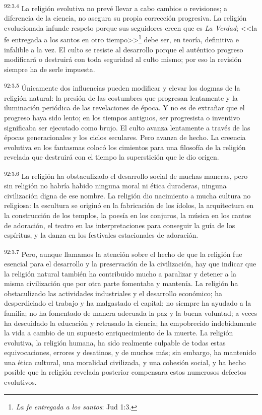 \documentclass[twoside, 11pt]{book}
\begin{document}
\par
\textsuperscript{92:3.4} La religión evolutiva no prevé llevar a cabo cambios o revisiones; a diferencia de la ciencia, no asegura su propia corrección progresiva. La religión evolucionada infunde respeto porque sus seguidores creen que es \textit{La Verdad}; <<la fe entregada a los santos en otro tiempo>>\footnote{\textit{La fe entregada a los santos}: Jud 1:3.} debe ser, en teoría, definitiva e infalible a la vez. El culto se resiste al desarrollo porque el auténtico progreso modificará o destruirá con toda seguridad al culto mismo; por eso la revisión siempre ha de serle impuesta.

\par
\textsuperscript{92:3.5} Únicamente dos influencias pueden modificar y elevar los dogmas de la religión natural: la presión de las costumbres que progresan lentamente y la iluminación periódica de las revelaciones de época. Y no es de extrañar que el progreso haya sido lento; en los tiempos antiguos, ser progresista o inventivo significaba ser ejecutado como brujo. El culto avanza lentamente a través de las épocas generacionales y los ciclos seculares. Pero avanza de hecho. La creencia evolutiva en los fantasmas colocó los cimientos para una filosofía de la religión revelada que destruirá con el tiempo la superstición que le dio origen.

\par
\textsuperscript{92:3.6} La religión ha obstaculizado el desarrollo social de muchas maneras, pero sin religión no habría habido ninguna moral ni ética duraderas, ninguna civilización digna de ese nombre. La religión dio nacimiento a mucha cultura no religiosa: la escultura se originó en la fabricación de los ídolos, la arquitectura en la construcción de los templos, la poesía en los conjuros, la música en los cantos de adoración, el teatro en las interpretaciones para conseguir la guía de los espíritus, y la danza en los festivales estacionales de adoración.

\par
\textsuperscript{92:3.7} Pero, aunque llamamos la atención sobre el hecho de que la religión fue esencial para el desarrollo y la preservación de la civilización, hay que indicar que la religión natural también ha contribuido mucho a paralizar y detener a la misma civilización que por otra parte fomentaba y mantenía. La religión ha obstaculizado las actividades industriales y el desarrollo económico; ha desperdiciado el trabajo y ha malgastado el capital; no siempre ha ayudado a la familia; no ha fomentado de manera adecuada la paz y la buena voluntad; a veces ha descuidado la educación y retrasado la ciencia; ha empobrecido indebidamente la vida a cambio de un supuesto enriquecimiento de la muerte. La religión evolutiva, la religión humana, ha sido realmente culpable de todas estas equivocaciones, errores y desatinos, y de muchos más; sin embargo, ha mantenido una ética cultural, una moralidad civilizada, y una cohesión social, y ha hecho posible que la religión revelada posterior compensara estos numerosos defectos evolutivos.
\end{document}

